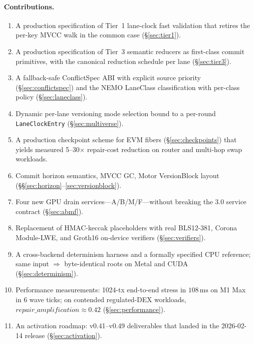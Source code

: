 \paragraph{Contributions.}
\begin{enumerate}[leftmargin=2em]
\item A production specification of Tier~1 lane-clock fast validation
      that retires the per-key MVCC walk in the common case
      (\S\ref{sec:tier1}).
\item A production specification of Tier~3 semantic reducers as
      first-class commit primitives, with the canonical reduction
      schedule per lane (\S\ref{sec:tier3}).
\item A fallback-safe ConflictSpec ABI with explicit source priority
      (\S\ref{sec:conflictspec}) and the NEMO LaneClass classification
      with per-class policy (\S\ref{sec:laneclass}).
\item Dynamic per-lane versioning mode selection bound to a per-round
      \texttt{LaneClockEntry} (\S\ref{sec:multiverse}).
\item A production checkpoint scheme for EVM fibers
      (\S\ref{sec:checkpoints}) that yields measured 5--30$\times$
      repair-cost reduction on router and multi-hop swap workloads.
\item Commit horizon semantics, MVCC GC, Motor VersionBlock layout
      (\S\S\ref{sec:horizon}--\ref{sec:versionblock}).
\item Four new GPU drain services---A/B/M/F---without breaking the 3.0
      service contract (\S\ref{sec:abmf}).
\item Replacement of HMAC-keccak placeholders with real BLS12-381,
      Corona Module-LWE, and Groth16 on-device verifiers
      (\S\ref{sec:verifiers}).
\item A cross-backend determinism harness and a formally specified CPU
      reference; same input $\Rightarrow$ byte-identical roots on
      Metal and CUDA (\S\ref{sec:determinism}).
\item Performance measurements: 1024-tx end-to-end stress in
      $108\,\text{ms}$ on M1 Max in 6 wave ticks; on contended
      regulated-DEX workloads, $\mathit{repair\_amplification} \approx
      0.42$ (\S\ref{sec:performance}).
\item An activation roadmap: v0.41--v0.49 deliverables that landed in
      the 2026-02-14 release (\S\ref{sec:activation}).
\end{enumerate}

